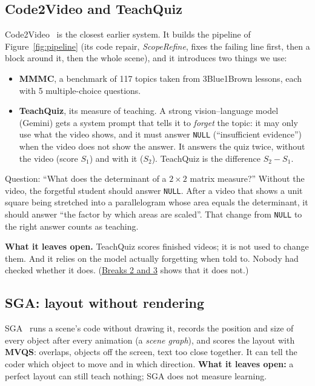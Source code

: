 \documentclass[11pt]{article}
\begin{document}
\subsection{Code2Video and TeachQuiz}

Code2Video~\cite{code2video} is the closest earlier system. It builds the pipeline of Figure~\ref{fig:pipeline} (its
code repair, \emph{ScopeRefine}, fixes the failing line first, then a block around it, then the whole scene), and it
introduces two things we use:
\begin{itemize}
  \item \textbf{MMMC}, a benchmark of 117 topics taken from 3Blue1Brown lessons, each with 5 multiple-choice questions.
  \item \textbf{TeachQuiz}, its measure of teaching. A strong vision--language model (Gemini) gets a system prompt
  that tells it to \emph{forget} the topic: it may only use what the video shows, and it must answer \texttt{NULL}
  (``insufficient evidence'') when the video does not show the answer. It answers the quiz twice, without the video
  (score $S_1$) and with it ($S_2$). TeachQuiz is the difference $S_2 - S_1$.
\end{itemize}

\begin{example}
Question: ``What does the determinant of a $2\times2$ matrix measure?'' Without the video, the forgetful student
should answer \texttt{NULL}. After a video that shows a unit square being stretched into a parallelogram whose area
equals the determinant, it should answer ``the factor by which areas are scaled''. That change from \texttt{NULL}
to the right answer counts as teaching.
\end{example}

\DiagTeachQuiz
{}

\textbf{What it leaves open.} TeachQuiz scores finished videos; it is not used to change them. And it relies on the
model actually forgetting when told to. Nobody had checked whether it does. (\hyperref[sec:refuse]{Breaks 2 and 3} shows that it
does not.)

\subsection{SGA: layout without rendering}

SGA~\cite{sga} runs a scene's code without drawing it, records the position and size of every object after every
animation (a \emph{scene graph}), and scores the layout with \textbf{MVQS}: overlaps, objects off the screen, text
too close together. It can tell the coder which object to move and in which direction. \textbf{What it leaves
open:} a perfect layout can still teach nothing; SGA does not measure learning.
\end{document}
